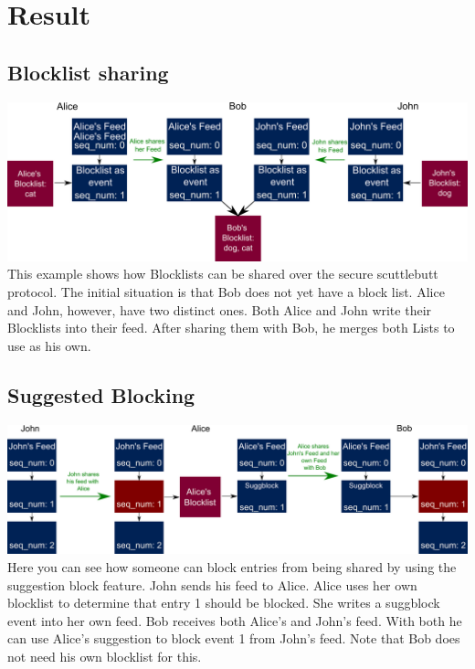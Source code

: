 \documentclass[12pt]{article}
\begin{document}
\section{Result}

\subsection{Blocklist sharing}
\vspace{0.5cm}
\includegraphics[width=\textwidth]{graph2}\vspace{0.5cm}
This example shows how Blocklists can be shared over the secure scuttlebutt protocol.
The initial situation is that Bob does not yet have a block list. Alice and John, however, have two distinct ones.
Both Alice and John write their Blocklists into their feed.
After sharing them with Bob, he merges both Lists to use as his own.


\subsection{Suggested Blocking}
\vspace{0.5cm}
\includegraphics[width=\textwidth]{graph1}\vspace{0.5cm}
Here you can see how someone can block entries from being shared by using the suggestion block feature.
John sends his feed to Alice. Alice uses her own blocklist to determine that entry 1 should be blocked.
She writes a suggblock event into her own feed. Bob receives both Alice's and John's feed. 
With both he can use Alice's suggestion to block event 1 from John's feed.
Note that Bob does not need his own blocklist for this.
\end{document}
